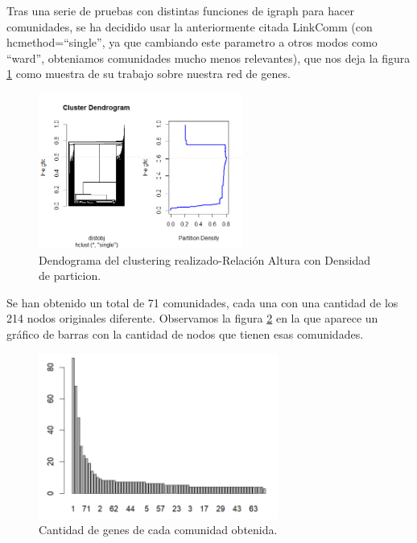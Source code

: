 Tras una serie de pruebas con distintas funciones de igraph para hacer comunidades, se ha decidido usar la anteriormente citada LinkComm (con hcmethod=“single”, ya que cambiando este parametro a otros modos como “ward”, obteniamos comunidades mucho menos relevantes), que nos deja la figura \ref{fig:LinkComm1} como muestra de su trabajo sobre nuestra red de genes.

\begin{figure}[h]
	\centering
	\includegraphics[width=0.60\textwidth]{figures/Grapichs_LinkComm.png}
	\caption{Dendograma del clustering realizado-Relación Altura con Densidad de particion. }
	\label{fig:LinkComm1}
\end{figure}

\newpage

\hfill

Se han obtenido un total de 71 comunidades, cada una con una cantidad de los 214 nodos originales diferente. Observamos la figura \ref{fig:LinkComm2} en la que aparece un gráfico de barras con la cantidad de nodos que tienen esas comunidades.

\begin{figure}[h]
	\centering
	\includegraphics[width=0.70\textwidth]{figures/barplot_communities.PNG}
	\caption{Cantidad de genes de cada comunidad obtenida.}
	\label{fig:LinkComm2}
\end{figure}


